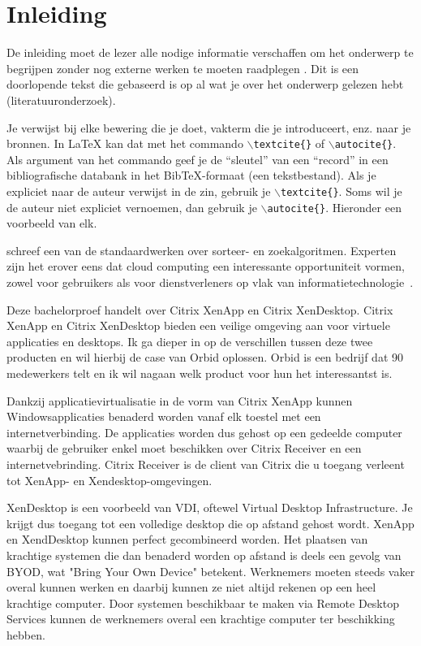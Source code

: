 
\chapter{Inleiding}
\label{ch:inleiding}

De inleiding moet de lezer alle nodige informatie verschaffen om het onderwerp te begrijpen zonder nog externe werken te moeten raadplegen \autocite{Pollefliet2011}. Dit is een doorlopende tekst die gebaseerd is op al wat je over het onderwerp gelezen hebt (literatuuronderzoek).

Je verwijst bij elke bewering die je doet, vakterm die je introduceert, enz. naar je bronnen. In \LaTeX{} kan dat met het commando \texttt{$\backslash${textcite\{\}}} of \texttt{$\backslash${autocite\{\}}}. Als argument van het commando geef je de ``sleutel'' van een ``record'' in een bibliografische databank in het Bib\TeX{}-formaat (een tekstbestand). Als je expliciet naar de auteur verwijst in de zin, gebruik je \texttt{$\backslash${}textcite\{\}}.
Soms wil je de auteur niet expliciet vernoemen, dan gebruik je \texttt{$\backslash${}autocite\{\}}. Hieronder een voorbeeld van elk.

\textcite{Knuth1998} schreef een van de standaardwerken over sorteer- en zoekalgoritmen. Experten zijn het erover eens dat cloud computing een interessante opportuniteit vormen, zowel voor gebruikers als voor dienstverleners op vlak van informatietechnologie~\autocite{Creeger2009}.

Deze bachelorproef handelt over Citrix XenApp en Citrix XenDesktop. Citrix XenApp en Citrix XenDesktop bieden een veilige omgeving aan voor virtuele applicaties en desktops. Ik ga dieper in op de verschillen tussen deze twee producten en wil hierbij de case van Orbid oplossen. Orbid is een bedrijf dat 90 medewerkers telt en ik wil nagaan welk product voor hun het interessantst is.

Dankzij applicatievirtualisatie in de vorm van Citrix XenApp kunnen Windowsapplicaties benaderd worden vanaf elk toestel met een internetverbinding. De applicaties worden dus gehost op een gedeelde computer waarbij de gebruiker enkel moet beschikken over Citrix Receiver en een internetvebrinding. Citrix Receiver is de client van Citrix die u toegang verleent tot XenApp- en Xendesktop-omgevingen.

XenDesktop is een voorbeeld van VDI, oftewel Virtual Desktop Infrastructure. Je krijgt dus toegang tot een volledige desktop die op afstand gehost wordt. XenApp en XendDesktop kunnen perfect gecombineerd worden. Het plaatsen van krachtige systemen die dan benaderd worden op afstand is deels een gevolg van BYOD, wat "Bring Your Own Device" betekent. Werknemers moeten steeds vaker overal kunnen werken en daarbij kunnen ze niet altijd rekenen op een heel krachtige computer. Door systemen beschikbaar te maken via Remote Desktop Services kunnen de werknemers overal een krachtige computer ter beschikking hebben.



